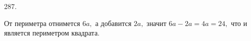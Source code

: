 287. \begin{center}
\begin{figure}[ht!]
\end{figure}
\end{center}
От периметра отнимется $6a,$ а добавится $2a,$ значит $6a-2a=4a=24,$ что и является периметром квадрата.\\
